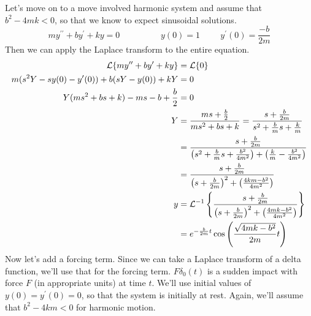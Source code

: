 \documentclass[fleqn,letterpaper]{report}
\begin{document}
\begin{example}
Let's move on to a move involved harmonic system and 
assume that $b^2 - 4mk < 0$, so that we know to expect
sinusoidal solutions. 
\begin{equation*}
my^{\prime \prime} + b y^\prime + ky = 0 \hspace{2cm} y(0) =
1 \hspace{1cm} y^\prime(0) = \frac{-b}{2m}
\end{equation*}
Then we can apply the Laplace transform to the entire equation.
\begin{align*}
\mathcal{L} \{ my^{\prime \prime} + b y^\prime + ky \} & = \mathcal{L} \{ 0
\} \\
m (s^2Y - sy(0) - y^\prime(0)) + b(sY - y(0)) + kY & = 0 \\
Y(ms^2 + bs + k) - ms - b + \frac{b}{2} & = 0 \\
Y & = \frac{ms+\frac{b}{2} }{ms^2+bs+k} 
= \frac{s + \frac{b}{2m}}{s^2 + \frac{b}{m} s + \frac{k}{m}} \\
& = \frac{s + \frac{b}{2m}}{ \left( s^2 + \frac{b}{m} s +
\frac{b^2}{4m^2} \right)+ \left( \frac{k}{m} - \frac{b^2}{4m^2}
\right) } \\
& = \frac{s + \frac{b}{2m}}{ \left( s + \frac{b}{2m} \right)^2 +
\left( \frac{4km - b^2}{4m^2} \right)} \\
y & = \mathcal{L}^{-1} \left\{ \frac{s + \frac{b}{2m}}{ \left( s + \frac{b}{2m}
\right)^2 + \left( \frac{4mk - b^2}{4m^2} \right)} \right\} \\
& = e^{-\frac{b}{2m}t} \cos \left( \frac{\sqrt{4mk-b^2}}{2m} t
\right) 
\end{align*} 
Now let's add a forcing term. Since we can take a Laplace
transform of a delta function, we'll use that for the forcing
term. $F\delta_0(t)$ is a sudden impact with force $F$ (in
appropriate units) at time $t$. We'll use initial values of
$y(0) = y^\prime(0) = 0$, so that the system is initially at
rest. Again, we'll assume that $b^2 -4km < 0$ for harmonic motion. 


\end{example}
\end{document}
